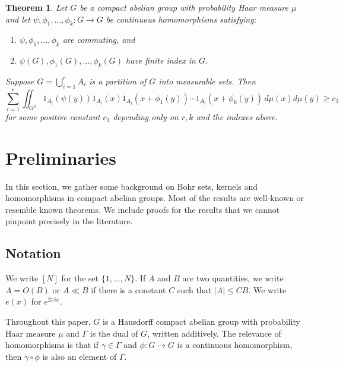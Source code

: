\documentclass[10pt]{article}
\newtheorem{theorem}{Theorem}[section]
\theoremstyle{definition}
\begin{document}
\setcounter{theorem}{10}\setcounter{equation}{3}
\begin{theorem} \label{th:counting-partition}
Let $G$ be a compact abelian group with  probability Haar measure $\mu$ and let $\psi, \phi_1, \ldots, \phi_k: G \to G$ be continuous homomorphisms satisfying:
\begin{enumerate}[label=(\alph*), leftmargin=*]
\item $\psi, \phi_1, \ldots, \phi_k$ are commuting, and
\item $\psi(G), \phi_1(G), \ldots, \phi_k(G)$ have finite index in $G$.
\end{enumerate}
Suppose $G = \bigcup_{i=1}^r A_i$ is a partition of $G$ into measurable sets. Then 
\begin{equation} \label{eq:counting-brauer}
\sum_{i=1}^r \iint_{G^2} 1_{A_i}(\psi(y)) 1_{A_i}(x) 1_{A_i}(x + \phi_1(y)) \cdots 1_{A_i}(x + \phi_k(y)) \, d \mu(x) d\mu(y) \geq c_3
\end{equation} 
for some positive constant $c_3$ depending only on $r, k$ and the indexes above.
\end{theorem}
\setcounter{equation}{4}
\section{Preliminaries}
\label{sec:prelim}
In this section, we gather some background on Bohr sets, kernels and homomorphisms in compact abelian groups. Most of the results are well-known or resemble known theorems. We include proofs for the results that we cannot pinpoint precisely in the literature. 


\subsection{Notation} We write $[N]$ for the set $\{ 1, \ldots, N\}$. If $A$ and $B$ are two quantities, we write $A = O(B)$ or $A \ll B$ if there is a constant $C$ such that $|A| \leq CB$. We write $e(x)$ for $e^{2 \pi i x}$.

Throughout this paper, $G$ is a Hausdorff compact abelian group with probability Haar measure $\mu$ and  $\Gamma$ is the dual of $G$, written additively. The relevance of homomorphisms is that if $\gamma \in \Gamma$ and $\phi:G \rightarrow G$ is a continuous homomorphism, then $\gamma \circ \phi$ is also an element of $\Gamma$.
\end{document}
